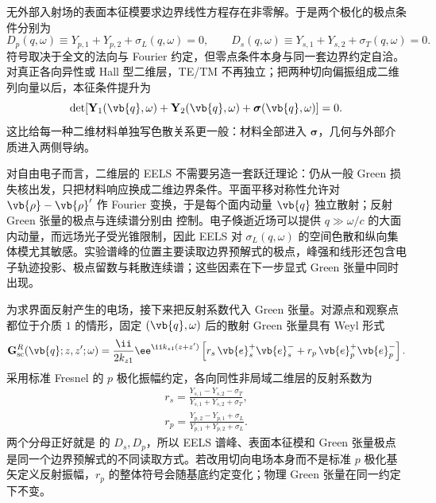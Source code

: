 无外部入射场的表面本征模要求边界线性方程存在非零解。于是两个极化的极点条件分别为
\begin{equation}
{
D_p(q,\omega)
\equiv
Y_{p,1}+Y_{p,2}+\sigma_L(q,\omega)=0,
\qquad
D_s(q,\omega)
\equiv
Y_{s,1}+Y_{s,2}+\sigma_T(q,\omega)=0.}
\label{eq:2d_sheet_surface_mode_conditions}
\end{equation}
符号取决于全文的法向与 Fourier 约定，但零点条件本身与同一套边界约定自洽。对真正各向异性或 Hall 型二维层，TE/TM 不再独立；把两种切向偏振组成二维列向量以后，本征条件提升为
\begin{equation}
{
\det\!\left[
\mathbf Y_1(\vb{q},\omega)
+\mathbf Y_2(\vb{q},\omega)
+\boldsymbol\sigma(\vb{q},\omega)
\right]=0.}
\label{eq:2d_sheet_anisotropic_pole_determinant}
\end{equation}
这比给每一种二维材料单独写色散关系更一般：材料全部进入 $\boldsymbol\sigma$，几何与外部介质进入两侧导纳。

对自由电子而言，二维层的 EELS 不需要另造一套跃迁理论：仍从一般 Green 损失核出发，只把材料响应换成二维边界条件。平面平移对称性允许对 $\vb{\rho}-\vb{\rho}'$ 作 Fourier 变换，于是每个面内动量 $\vb{q}$ 独立散射；反射 Green 张量的极点与连续谱分别由 控制。电子倏逝近场可以提供 $q\gg\omega/c$ 的大面内动量，而远场光子受光锥限制，因此 EELS 对 $\sigma_L(q,\omega)$ 的空间色散和纵向集体模尤其敏感\cite{Simonaitis2025EELS2D}。实验谱峰的位置主要读取边界预解式的极点，峰强和线形还包含电子轨迹投影、极点留数与耗散连续谱；这些因素在下一步显式 Green 张量中同时出现。

为求界面反射产生的电场，接下来把反射系数代入 Green 张量。对源点和观察点都位于介质 $1$ 的情形，固定 $(\vb{q},\omega)$ 后的散射 Green 张量具有 Weyl 形式
\begin{equation}
{
\mathbf G_{\rm sc}^R(\vb{q};z,z';\omega)
=\frac{\ii}{2k_{z1}}\ee^{\ii k_{z1}(z+z')}
\left[r_s\,\vb{e}_s^+\vb{e}_s^-+r_p\,\vb{e}_p^+\vb{e}_p^-\right].}
\label{eq:2d_sheet_reflected_green_weyl}
\end{equation}
采用标准 Fresnel 的 $p$ 极化振幅约定，各向同性非局域二维层的反射系数为
\begin{align}
{r_s
=\frac{Y_{s,1}-Y_{s,2}-\sigma_T}
{Y_{s,1}+Y_{s,2}+\sigma_T},}
\label{eq:2d_sheet_rs_conductivity}\\
{r_p
=\frac{Y_{p,2}-Y_{p,1}+\sigma_L}
{Y_{p,1}+Y_{p,2}+\sigma_L}.}
\label{eq:2d_sheet_rp_conductivity}
\end{align}
两个分母正好就是 的 $D_s,D_p$，所以 EELS 谱峰、表面本征模和 Green 张量极点是同一个边界预解式的不同读取方式。若改用切向电场本身而不是标准 $p$ 极化基矢定义反射振幅，$r_p$ 的整体符号会随基底约定变化；物理 Green 张量在同一约定下不变。

